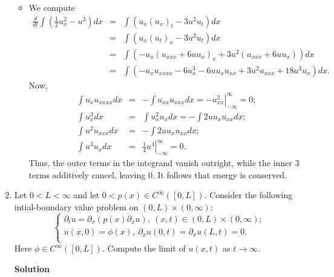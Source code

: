 \documentclass{article}
\begin{document}
\begin{enumerate}
\begin{itemize}
\item We compute
\begin{eqnarray*}
\frac{d}{dt} \int \left( \frac{1}{2} u_x^2 - u^3 \right) dx
& = & \int \left( u_x (u_x)_t - 3 u^2 u_t \right) dx \\
& = & \int \left( u_x (u_t)_x - 3 u^2 u_t \right) dx \\
& = & \int \left( -u_x \left( u_{xxx} + 6 u u_x \right)_x + 3 u^2 \left( u_{xxx} + 6 u u_x \right) \right) dx \\
& = & \int \left( -u_x u_{xxxx} - 6 u_x^3 - 6 u u_x u_{xx} + 3 u^2 u_{xxx} + 18 u^3 u_x \right) dx.
\end{eqnarray*}
Now,
\begin{eqnarray*}
\int u_x u_{xxxx} dx & = & -\int u_{xx} u_{xxx} dx = \left. -u_{xx}^2 \right|_{-\infty}^{\infty} = 0; \\
\int u_x^3 dx & = & \int u_x^2 u_x dx = -\int 2 u u_x u_{xx} dx; \\
\int u^2 u_{xxx} dx & = & -\int 2 u u_x u_{xx} dx; \\
\int u^3 u_x dx & = & \left. \frac{1}{4} u^4 \right|_{-\infty}^{\infty} = 0.
\end{eqnarray*}
Thus, the outer terms in the integrand vanish outright, while the inner \(3\) terms additively cancel, leaving \(0\).  It follows that energy is conserved.

\end{itemize}



\item Let \(0 < L < \infty\) and let \(0 < p(x) \in C^{\infty}([0,L])\).  Consider the following intial-boundary value problem on \((0,L) \times (0,\infty)\):
\[\left\{
\begin{array}{l}
\partial_t u = \partial_x \left( p(x) \partial_x u \right), \ (x,t) \in (0,L) \times (0,\infty); \\
u(x,0) = \phi(x), \ \partial_x u(0,t) = \partial_x u(L,t) = 0. \\
\end{array}
\right.\]
Here \(\phi \in C^{\infty}([0,L])\).  Compute the limit of \(u(x,t)\) as \(t \to \infty\).

{\bf Solution}


\end{enumerate}
\end{document}
